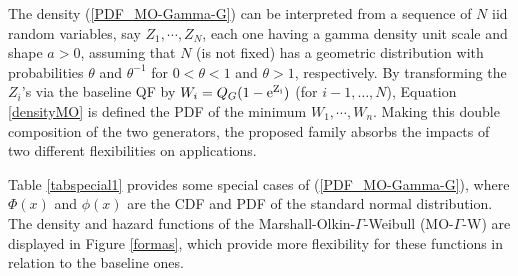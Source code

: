 \documentclass[12pt,a4paper]{article} %
\begin{document}
The density (\ref{PDF_MO-Gamma-G}) can be interpreted from a sequence of $N$ iid random variables, say $Z_1,\cdots,Z_N$,
each one having a gamma density unit scale and shape $a>0$, assuming that $N$ (is not fixed) has a geometric 
distribution with probabilities $\theta$ and $\theta^{-1}$ for $0<\theta<1$ and $\theta>1$,
respectively. By transforming the $Z_i$'s via the baseline QF by $W_i=Q_G(1-\rm{e}^{Z_i})$
(for $i-1,\ldots,N$), Equation \eqref{densityMO} is defined the PDF of the minimum $W_1,\cdots,W_n$. 
Making this double composition of the two generators, the proposed family absorbs the impacts of two different flexibilities 
on applications. 


Table \ref{tabspecial1} provides some special cases of (\ref{PDF_MO-Gamma-G}), where
$\Phi(x)$ and $\phi(x)$ are the CDF and PDF of the standard normal distribution. The density and hazard functions
of the Marshall-Olkin-$\Gamma$-Weibull (MO-$\Gamma$-W) are displayed in Figure \ref{formas}, which provide
more flexibility for these functions in relation to the baseline ones.

\vspace{0.6cm}
\end{document}
